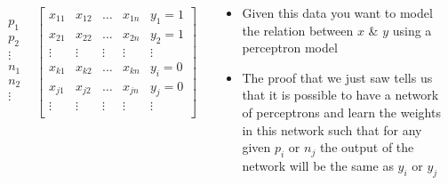 \documentclass[serif, aspectratio=169]{beamer}
\begin{document}
\begin{frame}
\begin{columns}
\begin{overlayarea}{\textwidth}{\textheight}
\begin{center}
\end{center}
\begin{align*}
\begin{array}{c} p_1 \\ p_2 \\ \vdots \\ n_1 \\ n_2 \\ \vdots\\ \end{array} & 
\begin{bmatrix}
    x_{11}       & x_{12} & \dots & x_{1n} & y_1=1 \\
    x_{21}       & x_{22} & \dots & x_{2n} & y_2=1 \\
    \vdots & \vdots &  \vdots & \vdots & \vdots \\
    x_{k1}       & x_{k2} & \dots & x_{kn} & y_i=0 \\
    x_{j1}       & x_{j2} & \dots & x_{jn} & y_j=0 \\
    \vdots & \vdots & \vdots & \vdots & \vdots \\
\end{bmatrix} 
\end{align*}
\end{overlayarea}
\begin{overlayarea}{\textwidth}{\textheight}

\begin{itemize}\justifying
\item<1-> Given this data you want to model the relation between $x$ \& $y$ using a perceptron model
\item<2-> The proof that we just saw tells us that it is possible to have a network of perceptrons and learn the weights in this network such that for any given $p_i$ or $n_j$ the output of the network will be the same as $y_i$ or $y_j$
\end{itemize}
\end{overlayarea}
\end{columns}

\end{frame}
\end{document}
